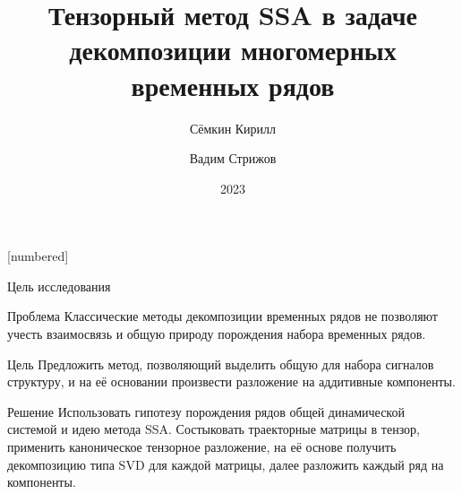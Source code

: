 
\usepackage[justification=centering, font=footnotesize]{caption}
[numbered]

\setlength{\parskip}{0.1cm}

\author{Сёмкин Кирилл \and Вадим Стрижов \\ }
\date{2023}
\title{Тензорный метод SSA в задаче декомпозиции многомерных временных рядов}


	
	\begin{frame}[c]
		\titlepage
	\end{frame}

	\begin{frame}{Цель исследования}
		
		{
		\begin{alertblock}{Проблема}
			Классические методы декомпозиции временных рядов не позволяют учесть взаимосвязь и общую природу порождения набора временных рядов.
		\end{alertblock}
		}
		
		\begin{block}{Цель}
			Предложить метод, позволяющий выделить общую для набора сигналов структуру, и на её основании произвести разложение на аддитивные компоненты.
		\end{block}
		
		\begin{exampleblock}{Решение}
			Использовать гипотезу порождения рядов общей динамической системой и идею метода SSA. Состыковать траекторные матрицы в тензор, применить каноническое тензорное разложение, на её основе получить декомпозицию типа SVD для каждой матрицы, далее разложить каждый ряд на компоненты.
		\end{exampleblock}
		
	\end{frame}
	
